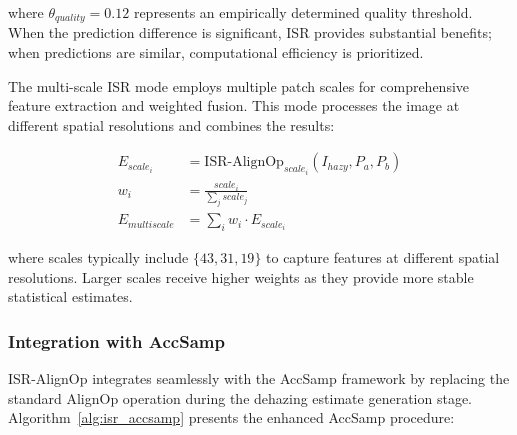 \documentclass{article}
\begin{document}
where $\theta_{quality} = 0.12$ represents an empirically determined quality threshold. When the prediction difference is significant, ISR provides substantial benefits; when predictions are similar, computational efficiency is prioritized.

The multi-scale ISR mode employs multiple patch scales for comprehensive feature extraction and weighted fusion. This mode processes the image at different spatial resolutions and combines the results:

\begin{align}
E_{scale_i} &= \text{ISR-AlignOp}_{scale_i}(I_{hazy}, P_a, P_b) \label{eq:multiscale_isr} \\
w_i &= \frac{scale_i}{\sum_{j} scale_j} \label{eq:scale_weight} \\
E_{multiscale} &= \sum_{i} w_i \cdot E_{scale_i} \label{eq:multiscale_fusion}
\end{align}

where scales typically include $\{43, 31, 19\}$ to capture features at different spatial resolutions. Larger scales receive higher weights as they provide more stable statistical estimates.

\subsubsection{Integration with AccSamp}

ISR-AlignOp integrates seamlessly with the AccSamp framework by replacing the standard AlignOp operation during the dehazing estimate generation stage. Algorithm~\ref{alg:isr_accsamp} presents the enhanced AccSamp procedure:
\end{document}
